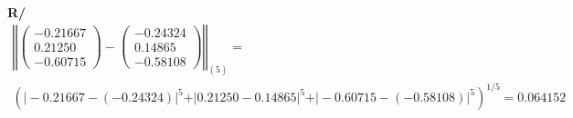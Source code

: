 \documentclass[12pt]{article}
\begin{document}
\begin{enumerate}[leftmargin=*,widest=9]
{\begin{enumerate}[label=\alph*]
\textbf{R/}
   \begin{eqnarray*}
\left\Vert \begin{pmatrix}-0.21667\\0.21250\\-0.60715\end{pmatrix} - \begin{pmatrix} -0.24324 \\ 0.14865 \\ -0.58108 \end{pmatrix} \right\Vert_{(5)}= \\{\left(\vert -0.21667 - (-0.24324) \vert^5 + \vert 0.21250 - 0.14865 \vert^5 + \vert -0.60715 - (-0.58108) \vert^5\right)}^{1/5} = 0.064152
   \end{eqnarray*}
\end{enumerate}
}
   \end{enumerate}
\end{document}
